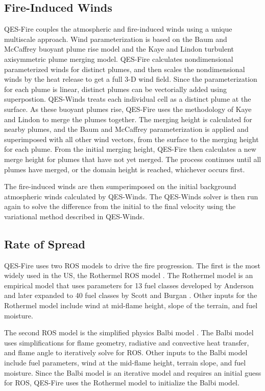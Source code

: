 \subsection{Fire-Induced Winds}

QES-Fire couples the atmospheric and fire-induced winds using a unique multiscale approach. Wind parameterization is based on the Baum and McCaffrey \cite{Baum1989} buoyant plume rise model and the Kaye and Lindon \cite{kaye_linden_2004} turbulent axisymmetric plume merging model. QES-Fire calculates nondimensional parameterized winds for distinct plumes, and then scales the nondimensional winds by the heat release to get a full 3-D wind field. Since the parameterization for each plume is linear, distinct plumes can be vectorially added using superpostion. QES-Winds treats each individual cell as a distinct plume at the surface. As these buoyant plumes rise, QES-Fire uses the methodology of Kaye and Lindon to merge the plumes together. The merging height is calculated for nearby plumes, and the Baum and McCaffrey parameterization is applied and superimposed with all other wind vectors, from the surface to the merging height for each plume. From the initial merging height, QES-Fire then calculates a new merge height for plumes that have not yet merged. The process continues until all plumes have merged, or the domain height is reached, whichever occurs first. 

The fire-induced winds are then sumperimposed on the initial background atmospheric winds calculated by QES-Winds. The QES-Winds solver is then run again to solve the difference from the initial to the final velocity using the variational method described in QES-Winds. 

\subsection{Rate of Spread}

QES-Fire uses two ROS models to drive the fire progression. The first is the most widely used in the US, the Rothermel ROS model \cite{Rothermel1972}. The Rothermel model is an empirical model that uses parameters for 13 fuel classes developed by Anderson \cite{anderson1982} and later expanded to 40 fuel classes by Scott and Burgan \cite{scott2005standard}. Other inputs for the Rothermel model include wind at mid-flame height, slope of the terrain, and fuel moisture. 

The second ROS model is the simplified physics Balbi model \cite{Balbi2020}. The Balbi model uses simplifications for flame geometry, radiative and convective heat transfer, and flame angle to iteratively solve for ROS. Other inputs to the Balbi model include fuel parameters, wind at the mid-flame height, terrain slope, and fuel moisture. Since the Balbi model is an iterative model and requires an initial guess for ROS, QES-Fire uses the Rothermel model to initialize the Balbi model. 

